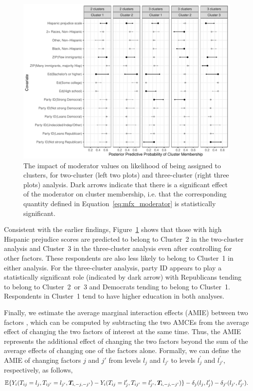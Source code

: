 \begin{figure}[!t]
\centering {}
\includegraphics[width=\textwidth]{figures/mod_plot.pdf}
\caption{The impact of moderator values on likelihood of being
  assigned to clusters, for two-cluster (left two plots) and
  three-cluster (right three plots) analysis. 
 Dark arrows indicate that there is a significant effect of the moderator on cluster membership, i.e. that the corresponding quantity defined in Equation~\eqref{eq:mfx_moderator} is statistically significant.} \label{fig:mod}
\end{figure}

Consistent with the earlier findings, Figure~\ref{fig:mod} shows that
those with high Hispanic prejudice scores are predicted to belong to
Cluster~2 in the two-cluster analysis and Cluster~3 in the
three-cluster analysis even after controlling for other factors.
These respondents are also less likely to belong to Cluster~1 in
either analysis.  For the three-cluster analysis, party ID appears to
play a statistically significant role (indicated by dark arrow) with
Republicans tending to belong to Cluster~2~or~3 and Democrats tending
to belong to Cluster~1.  Respondents in Cluster~1 tend to have higher
education in both analyses.

Finally, we estimate the average marginal interaction effects (AMIE)
between two factors \citep{egam:imai:19}, which can be computed by
subtracting the two AMCEs from the average effect of changing the two
factors of interest at the same time.  Thus, the AMIE represents the
additional effect of changing the two factors beyond the sum of the
average effects of changing one of the factors alone.  Formally, we
can define the AMIE of changing factors $j$ and $j'$ from levels $l_j$
and $l_{j'}$ to levels $l_j^\prime$ and $l_{j'}^\prime$, respectively,
as follows, 
\begin{equation*}
  \mathbb{E}\{Y_i(T_{ij} = l_j, T_{ij'} = l_{j'}, \bm{T}_{i,-j,-j'}) - Y_i(T_{ij}
  = l_j^\prime, T_{ij'} = l_{j'}^\prime, \bm{T}_{i,-j,-j'})\} -
  \delta_j(l_j, l_j^\prime) - \delta_{j'}(l_{j'}, l_{j'}^\prime).
\end{equation*}

